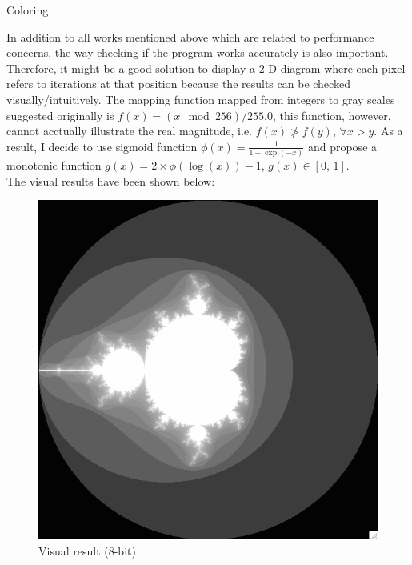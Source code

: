\documentclass[12pt]{article}
\makeatletter
\renewenvironment{itemize}
{\list{$\bullet$}{\leftmargin\z@ \labelwidth\z@ \itemindent-\leftmargin
\let\makelabel\descriptionlabel}}
{\endlist}
\makeatother
\begin{document}
\begin{itemize}
    \item Coloring
    \begin{flushleft}
        In addition to all works mentioned above which are related to performance concerns, the way checking if the program works accurately is also important. Therefore, it might be a good solution to display a 2-D diagram where each pixel refers to iterations at that position because the results can be checked visually/intuitively. The mapping function mapped from integers to gray scales suggested originally is $f(x) = (x \mod 256) / 255.0$, this function, however, cannot acctually illustrate the real magnitude, i.e. $f(x) \ngtr f(y)$, $\forall x > y$. As a result, I decide to use sigmoid function $\phi(x) = \frac{1}{1 + \exp(-x)}$ and propose a monotonic function $g(x) = 2 \times \phi(\log(x)) - 1$, $g(x) \in [0, \, 1]$. \\ The visual results have been shown below:
    \end{flushleft}
    \begin{figure}[ht]
        \begin{minipage}{.48\textwidth}
            \includegraphics[scale=.4]{./coloring_hw.png}
            \caption{Visual result (8-bit)}
        \end{minipage}
        \begin{minipage}{.48\textwidth}

\end{minipage}
\end{figure}
\end{itemize}
\end{document}
